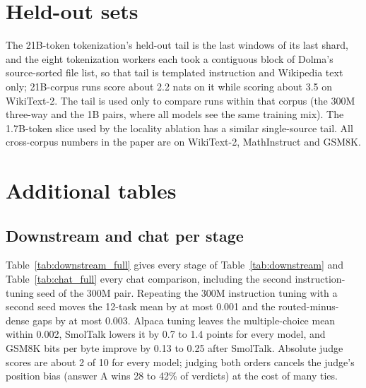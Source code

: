 \documentclass[11pt]{article}
\newcommand{\dagf}{DAGFormer}
\begin{document}
\section{Held-out sets}
\label{app:cache}
The 21B-token tokenization's held-out tail is the last windows of its last shard, and the eight tokenization workers each took a contiguous block of Dolma's source-sorted file list, so that tail is templated instruction and Wikipedia text only; 21B-corpus runs score about 2.2 nats on it while scoring about 3.5 on WikiText-2. The tail is used only to compare runs within that corpus (the 300M three-way and the 1B pairs, where all models see the same training mix). The 1.7B-token slice used by the locality ablation has a similar single-source tail. All cross-corpus numbers in the paper are on WikiText-2, MathInstruct and GSM8K.

\section{Additional tables}
\label{app:tables}

\subsection{Downstream and chat per stage}
\label{app:downstream}
\begin{table}[h]
\centering\scriptsize
\setlength{\tabcolsep}{1.5pt}

\caption{Table~\ref{tab:downstream} for the 1B models after 5B tokens. \dagf{} wins the chat comparison against the dense model after 5B tokens (0.58 and 0.59 after Alpaca and SmolTalk tuning) and against the dense model after 10B tokens (0.56 and 0.60).}
\label{tab:downstream_1b5b}
\end{table}
Table~\ref{tab:downstream_full} gives every stage of Table~\ref{tab:downstream} and Table~\ref{tab:chat_full} every chat comparison, including the second instruction-tuning seed of the 300M pair. Repeating the 300M instruction tuning with a second seed moves the 12-task mean by at most 0.001 and the routed-minus-dense gaps by at most 0.003. Alpaca tuning leaves the multiple-choice mean within 0.002, SmolTalk lowers it by 0.7 to 1.4 points for every model, and GSM8K bits per byte improve by 0.13 to 0.25 after SmolTalk. Absolute judge scores are about 2 of 10 for every model; judging both orders cancels the judge's position bias (answer A wins 28 to 42\% of verdicts) at the cost of many ties.
\end{document}
